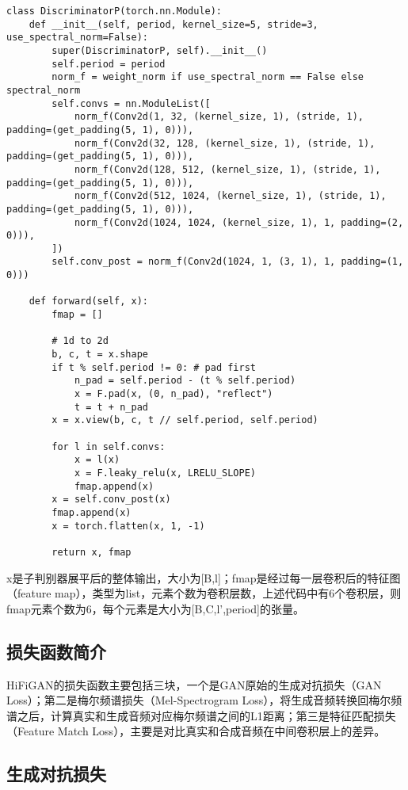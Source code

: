 \documentclass[cn,10pt,math=newtx,citestyle=gb7714-2015,bibstyle=gb7714-2015]{elegantbook}
\begin{document}
\begin{lstlisting}
class DiscriminatorP(torch.nn.Module):
    def __init__(self, period, kernel_size=5, stride=3, use_spectral_norm=False):
        super(DiscriminatorP, self).__init__()
        self.period = period
        norm_f = weight_norm if use_spectral_norm == False else spectral_norm
        self.convs = nn.ModuleList([
            norm_f(Conv2d(1, 32, (kernel_size, 1), (stride, 1), padding=(get_padding(5, 1), 0))),
            norm_f(Conv2d(32, 128, (kernel_size, 1), (stride, 1), padding=(get_padding(5, 1), 0))),
            norm_f(Conv2d(128, 512, (kernel_size, 1), (stride, 1), padding=(get_padding(5, 1), 0))),
            norm_f(Conv2d(512, 1024, (kernel_size, 1), (stride, 1), padding=(get_padding(5, 1), 0))),
            norm_f(Conv2d(1024, 1024, (kernel_size, 1), 1, padding=(2, 0))),
        ])
        self.conv_post = norm_f(Conv2d(1024, 1, (3, 1), 1, padding=(1, 0)))

    def forward(self, x):
        fmap = []

        # 1d to 2d
        b, c, t = x.shape
        if t % self.period != 0: # pad first
            n_pad = self.period - (t % self.period)
            x = F.pad(x, (0, n_pad), "reflect")
            t = t + n_pad
        x = x.view(b, c, t // self.period, self.period)

        for l in self.convs:
            x = l(x)
            x = F.leaky_relu(x, LRELU_SLOPE)
            fmap.append(x)
        x = self.conv_post(x)
        fmap.append(x)
        x = torch.flatten(x, 1, -1)

        return x, fmap
\end{lstlisting}

x是子判别器展平后的整体输出，大小为[B,l]；fmap是经过每一层卷积后的特征图（feature map），类型为list，元素个数为卷积层数，上述代码中有6个卷积层，则fmap元素个数为6，每个元素是大小为[B,C,l',period]的张量。

\subsection{损失函数简介}

HiFiGAN的损失函数主要包括三块，一个是GAN原始的生成对抗损失（GAN Loss）；第二是梅尔频谱损失（Mel-Spectrogram Loss），将生成音频转换回梅尔频谱之后，计算真实和生成音频对应梅尔频谱之间的L1距离；第三是特征匹配损失（Feature Match Loss），主要是对比真实和合成音频在中间卷积层上的差异。

\subsection{生成对抗损失}
\end{document}
